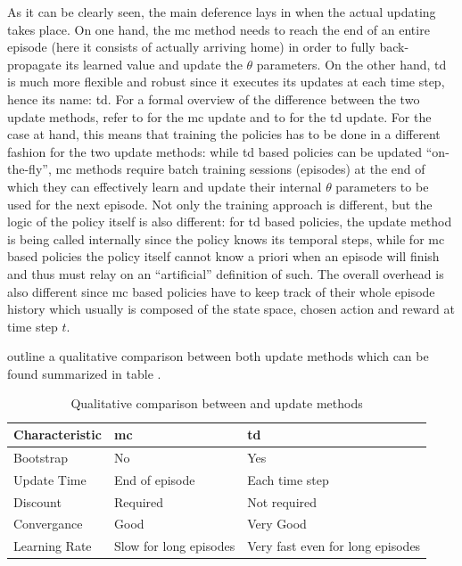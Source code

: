 
As it can be clearly seen, the main deference lays in when the actual updating takes place. On one hand, the \gls{mc} method needs to reach the end of an entire episode (\ie here it consists of actually arriving home) in order to fully back-propagate its learned value and update the $\theta$ parameters. On the other hand, \gls{td} is much more flexible and robust since it executes its updates at each time step, hence its name: \gls{td}.
For a formal overview of the difference between the two update methods, refer to  for the \gls{mc} update and to  for the \gls{td} update.
For the case at hand, this means that training the policies has to be done in a different fashion for the two update methods: while \gls{td} based policies can be updated ``on-the-fly'', \gls{mc} methods require batch training sessions (\ie episodes) at the end of which they can effectively learn and update their internal $\theta$ parameters to be used for the next episode. Not only the training approach is different, but the logic of the policy itself is also different: for \gls{td} based policies, the update method is being called internally since the policy knows its temporal steps, while for \gls{mc} based policies the policy itself cannot know a priori when an episode will finish and thus must relay on an ``artificial'' definition of such. The overall overhead is also different since \gls{mc} based policies have to keep track of their whole episode history which usually is composed of the state space, chosen action and reward at time step $t$.

\citet{Sutton2017} outline a qualitative comparison between both update methods which can be found summarized in table .

\begin{table}[!ht]
	\centering
		\begin{tabular}{@{}lll@{}}
		\toprule
		Characteristic & \gls{mc}                     & \gls{td}                               \\ \midrule
		Bootstrap      & No                     & Yes                              \\
		Update Time    & End of episode         & Each time step                   \\
		Discount       & Required               & Not required                     \\
		Convergance    & Good                   & Very Good                        \\
		Learning Rate  & Slow for long episodes & Very fast even for long episodes \\ \bottomrule
		\end{tabular}
	\caption{Qualitative comparison between  and  update methods \citep[p. 130]{Sutton2017}}
	\label{tab:mc_td_comp}
\end{table}

